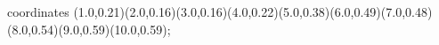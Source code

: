 					coordinates { (1.0,0.21)(2.0,0.16)(3.0,0.16)(4.0,0.22)(5.0,0.38)(6.0,0.49)(7.0,0.48)(8.0,0.54)(9.0,0.59)(10.0,0.59)};